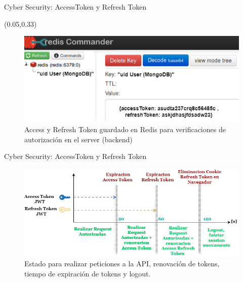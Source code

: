 \documentclass[xcolor=pdftex,dvipsnames,table]{beamer}
\begin{document}
\begin{frame}{Cyber Security: AccessToken y Refresh Token }
    \begin{textblock*}{0.64\textwidth}(0.05\textwidth,0.33\textwidth)  
                    \begin{figure}
                        \centering
                        \includegraphics[width=1\linewidth]{cyber/3SEGURITY3REdis.png}
                        \caption*{Access y Refresh Token guardado en Redis para verificaciones de autorización en el server (backend)}
                        \label{fig:my_label}
                    \end{figure}
    \end{textblock*}
    \end{frame}
\begin{frame}{Cyber Security: AccessToken y Refresh Token }
        \begin{figure}
            \centering
            \includegraphics[width=1\linewidth]{cyber/4SEGURITY.pngexpiracion.png}
            \caption*{ Estado para realizar peticiones a la API, renovación de tokens, tiempo de expiración de tokens y logout. }
            \label{fig:my_label}
        \end{figure}\end{frame}
\end{document}
